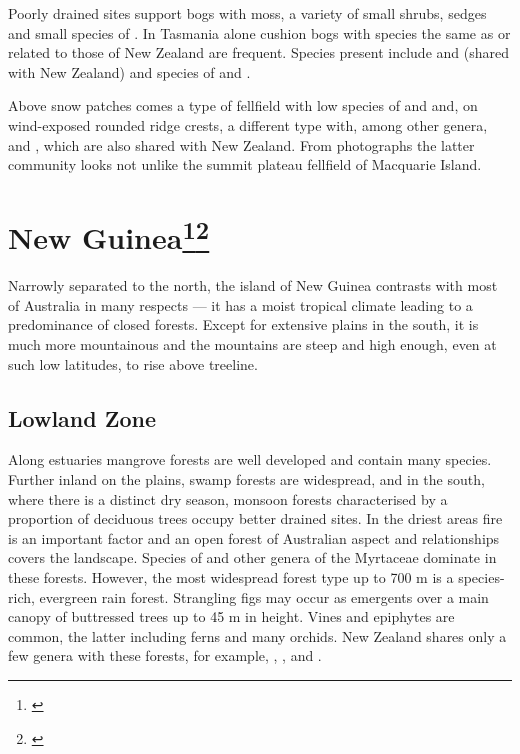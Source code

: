 Poorly drained sites support bogs with  moss, a variety of small shrubs, sedges and small species of .
In Tasmania alone cushion bogs with species the same as or related to those of New Zealand are frequent.
Species present include  and  (shared with New Zealand) and species of  and .

Above snow patches comes a type of fellfield with low species of  and  and, on wind-exposed rounded ridge crests, a different type with, among other genera,  and , which are also shared with New Zealand.
From photographs the latter community looks not unlike the summit plateau fellfield of Macquarie Island.

\section[New Guinea]{New Guinea\footnote{\cite{johns1982plant}}\footnote{\cite{wardle1973newguinea}}}

Narrowly separated to the north, the island of New Guinea contrasts with most of Australia in many respects — it has a moist tropical climate leading to a predominance of closed forests.
Except for extensive plains in the south, it is much more mountainous and the mountains are steep and high enough, even at such low latitudes, to rise above treeline.

\subsection{Lowland Zone}

Along estuaries mangrove forests are well developed and contain many species.
Further inland on the plains, swamp forests are widespread, and in the south, where there is a distinct dry season, monsoon forests characterised by a proportion of deciduous trees occupy better drained sites.
In the driest areas fire is an important factor and an open forest of Australian aspect and relationships covers the landscape.
Species of  and other genera of the Myrtaceae dominate in these forests.
However, the most widespread forest type up to 700 m is a species-rich, evergreen rain forest.
Strangling figs may occur as emergents over a main canopy of buttressed trees up to 45 m in height.
Vines and epiphytes are common, the latter including ferns and many orchids.
New Zealand shares only a few genera with these forests, for example, , ,  and .


